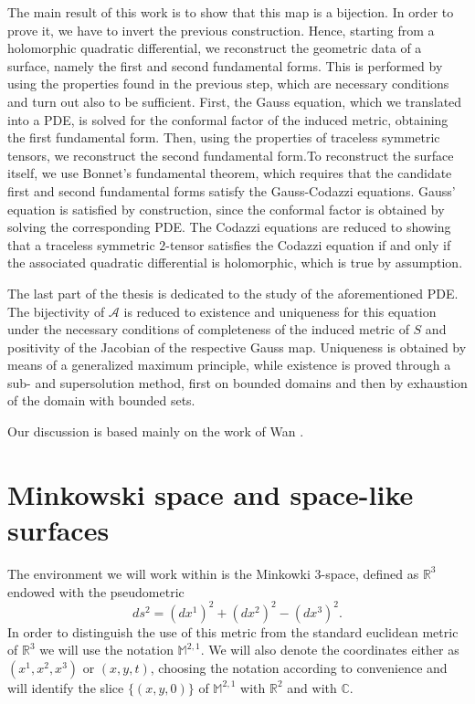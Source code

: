 \documentclass[a4paper,11pt,openright,twoside]{book}
\newcommand{\R}{\mathbb{R}}
\newcommand{\C}{\mathbb{C}}
\newcommand{\M}{\mathbb{M}^{2,1}}
\newcommand{\1}{\mathds{1}}
\theoremstyle{plain}
\theoremstyle{definition}
\theoremstyle{remark}
\begin{document}
The main result of this work is to show that this map is a bijection. In order to prove it, we have to invert the previous construction. Hence, starting from a holomorphic quadratic differential, we reconstruct the geometric data of a surface, namely the first and second fundamental forms. This is performed by using the properties found in the previous step, which are necessary conditions and turn out also to be sufficient. First, the Gauss equation, which we translated into a PDE, is solved for the conformal factor of the induced metric, obtaining the first fundamental form. Then, using the properties of traceless symmetric tensors, we reconstruct the second fundamental form.To reconstruct the surface itself, we use Bonnet's fundamental theorem, which requires that the candidate first and second fundamental forms satisfy the Gauss-Codazzi equations. Gauss' equation is satisfied by construction, since the conformal factor is obtained by solving the corresponding PDE. The Codazzi equations are reduced to showing that a traceless symmetric $2$-tensor satisfies the Codazzi equation if and only if the associated quadratic differential is holomorphic, which is true by assumption.


The last part of the thesis is dedicated to the study of the aforementioned PDE. The bijectivity of $\mathscr{A}$ is reduced to existence and uniqueness for this equation under the necessary conditions of completeness of the induced metric of $S$ and positivity of the Jacobian of the respective Gauss map. Uniqueness is obtained by means of a generalized maximum principle, while existence is proved through a sub- and supersolution method, first on bounded domains and then by exhaustion of the domain with bounded sets.


Our discussion is based mainly on the work of Wan \cite{Wan1992}.
\chapter{Minkowski space and space-like surfaces}\label{sc:splsrf}
The environment we will work within is the Minkowki 3-space, defined as $\R^3$ endowed with the pseudometric
\[ds^2 = ( dx^1)^{2} + (dx^2)^{2}-(dx^3)^2.\]
In order to distinguish the use of this metric from the standard euclidean metric of $\R^3$ we will use the notation $\M$. We will also denote the coordinates either as $(x^1,x^2,x^3)$ or $(x,y,t)$, choosing the notation according to convenience and will identify the slice $\{(x,y,0)\}$ of $\M$ with $\R^2$ and with $\C$.\\
\end{document}
